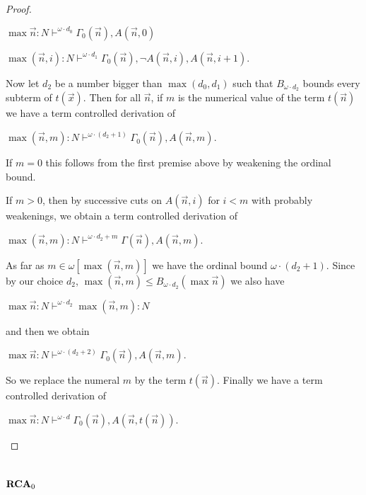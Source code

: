 \documentclass[8pt]{article}
\theoremstyle{definition}
\theoremstyle{definition}
\theoremstyle{definition}
\theoremstyle{definition}
\theoremstyle{definition}
\theoremstyle{definition}
\theoremstyle{definition}
\theoremstyle{definition}
\theoremstyle{definition}
\theoremstyle{definition}
\theoremstyle{definition}
\theoremstyle{definition}
\theoremstyle{definition}
\theoremstyle{question}
\begin{document}
\begin{proof}
\begin{enumerate}
    \begin{center}
      $\max \vec{n} : N \vdash^{\omega \cdot d_0} \Gamma_0(\vec{n}), A(\vec{n}, 0)$

      $\max(\vec{n}, i) : N \vdash^{\omega \cdot d_1} \Gamma_0(\vec{n}), \neg A(\vec{n}, i), A(\vec{n}, i + 1)$.
    \end{center}
  Now let $d_2$ be a number bigger than $\max(d_0, d_1)$ such that $B_{\omega \cdot d_2}$ bounds
  every subterm of $t(\vec{x})$. Then for all $\vec{n}$, if $m$ is the numerical value of the term $t(\vec{n})$
  we have a term controlled derivation of
  \begin{center}
    $\max(\vec{n}, m) : N \vdash^{\omega \cdot (d_2 + 1)} \Gamma_0(\vec{n}), A(\vec{n}, m)$.
  \end{center}
  If $m = 0$ this follows from the first premise above by weakening the ordinal bound.

  If $m > 0$, then by successive cuts on $A(\vec{n}, i)$ for $i < m$ with probably weakenings, we obtain
  a term controlled derivation of
  \begin{center}
    $\max(\vec{n}, m) : N \vdash^{\omega \cdot d_2 + m} \Gamma(\vec{n}), A(\vec{n}, m)$.
  \end{center}
  As far as $m \in \omega[\max(\vec{n}, m)]$ we have the ordinal bound $\omega \cdot (d_2 + 1)$.
  Since by our choice $d_2$, $\max(\vec{n}, m) \leq B_{\omega \cdot d_2}(\max \vec{n})$
  we also have
  \begin{center}
    $\max \vec{n} : N \vdash^{\omega \cdot d_2} \max(\vec{n}, m) : N$
  \end{center}
  and then we obtain
  \begin{center}
    $\max \vec{n} : N \vdash^{\omega \cdot (d_2 + 2)} \Gamma_0(\vec{n}), A(\vec{n}, m)$.
  \end{center}

  So we replace the numeral $m$ by the term $t(\vec{n})$. Finally we have a term controlled derivation of
  \begin{center}
    $\max \vec{n} : N \vdash^{\omega \cdot d} \Gamma_0(\vec{n}), A(\vec{n}, t(\vec{n}))$.
  \end{center}
  \end{enumerate}
\end{proof}

\section{${\bf RCA}_0$}
\end{document}
